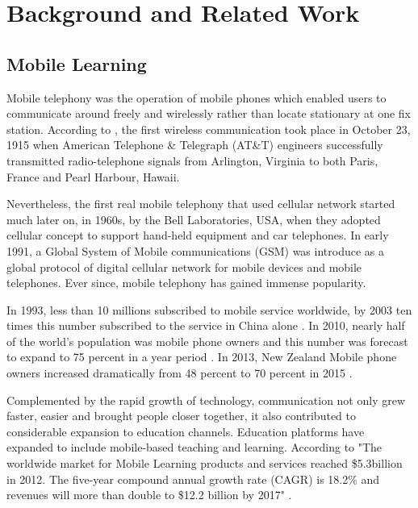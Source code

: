\chapter{Background and Related Work}\label{C:ex}


\section{Mobile Learning}

Mobile telephony was the operation of mobile phones which enabled users to communicate around freely and wirelessly rather than locate stationary at one fix station. According to \cite{hild1995brief}, the first wireless communication took place in October 23, 1915 when American Telephone \& Telegraph (AT\&T) engineers successfully transmitted radio-telephone signals from Arlington, Virginia to both Paris, France and Pearl Harbour, Hawaii. 

Nevertheless, the first real mobile telephony that used cellular network started much later on, in 1960s, by the Bell Laboratories, USA, when they adopted cellular concept to support hand-held equipment and car telephones. In early 1991, a Global System of Mobile communications (GSM) was introduce as a global protocol of digital cellular network for mobile devices and mobile telephones. Ever since, mobile telephony has gained immense popularity. 

In 1993, less than 10 millions subscribed to mobile service worldwide, by 2003 ten times this number subscribed to the service in China alone \cite{jones2006mobile}. In 2010, nearly half of the world's population was mobile phone owners and this number was forecast to expand to 75 percent in a year period \cite{liu2010understanding}. In 2013, New Zealand Mobile phone owners increased dramatically from 48 percent to 70 percent in 2015 \cite{nzreport}. 

Complemented by the rapid growth of technology, communication not only grew faster, easier and brought people closer together, it also contributed to considerable expansion to education channels. Education platforms have expanded to include mobile-based teaching and learning. According to \cite{mlearningreport} "The worldwide market for Mobile Learning products and services reached \$5.3billion in 2012. The five-year compound annual growth rate (CAGR) is 18.2\% and revenues will more than double to \$12.2 billion by 2017" \cite[pp. 13]{mlearningreport}.


